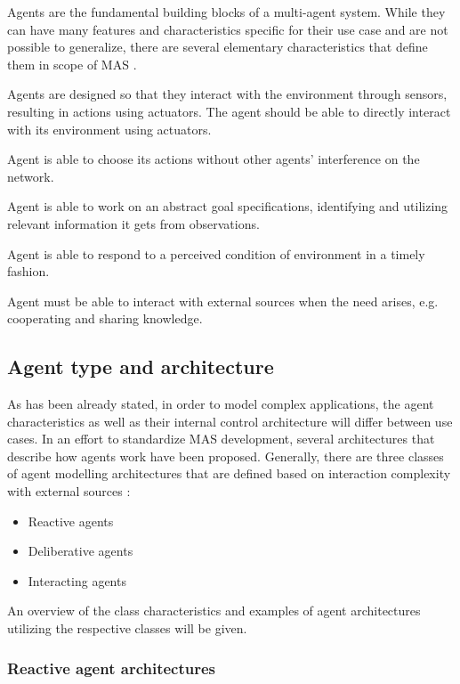\documentclass[main.tex]{subfiles}
\begin{document}
Agents are the fundamental building blocks of a multi-agent system. While they can have many
features and characteristics specific for their use case and are not possible to generalize,
there are several elementary characteristics that define them in scope of MAS
\cite{ParasumannaGokulan2010}.

Agents are designed so that they interact with the environment through sensors,
resulting in actions using actuators.  The agent should be able to directly interact with its
environment using actuators.

Agent is able to choose its actions without other agents' interference on the network.

Agent is able to work on an abstract goal specifications, identifying and utilizing relevant
information it gets from observations.

Agent is able to respond to a perceived condition of environment in a timely fashion.

Agent must be able to interact with external sources when the need arises, e.g. cooperating
and sharing knowledge.

\subsection{Agent type and architecture}

As has been already stated, in order to model complex applications, the agent characteristics as
well as their internal control architecture will differ between use cases. In an effort to standardize
MAS development, several architectures that describe how agents work have been proposed. Generally,
there are three classes of agent modelling architectures that are defined based on interaction
complexity with external sources \cite{Anthony2014}:

\begin{itemize}
    \item Reactive agents
    \item Deliberative agents
    \item Interacting agents
\end{itemize}

An overview of the class characteristics and examples of agent architectures utilizing
the respective classes will be given.

\subsubsection{Reactive agent architectures}
\end{document}
